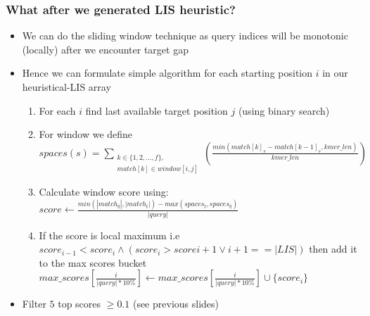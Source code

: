 \begin{frame}
  \frametitle{What after we generated LIS heuristic?}

  \begin{itemize}
    \item We can do the sliding window technique as query indices will be monotonic (locally) after we encounter target gap
    \item Hence we can formulate simple algorithm for each starting position $i$ in our heuristical-LIS array
    \begin{enumerate}
        \item For each $i$ find last available target position $j$ (using binary search)
        \item For window we define $spaces(s) = \sum_{\substack{k \in \{1,2,...,f\},\\match[k] \in window [i, j]}} {(\frac{min(match[k]_s-match[k-1]_s, kmer\_len)}{kmer\_len})}$
        \item Calculate window score using: $score \gets \frac{min(|match_q|, |match_t|) - max(spaces_t, spaces_q)}{|query|}$
        \item If the score is local maximum i.e $score_{i-1} < score_{i} \land (score_{i} > score{i+1} \lor i+1 == |LIS|)$ then add it to the max scores bucket $max\_scores[\frac{i}{|query|*10\%}] \gets max\_scores[\frac{i}{|query|*10\%}] \cup \{score_{i}\}$
    \end{enumerate}
    \item Filter $5$ top scores $\geq 0.1$ (see previous slides)
  \end{itemize}
\end{frame}



